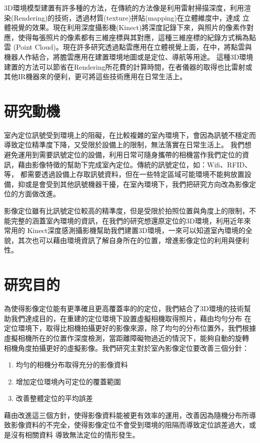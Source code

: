 	3D環境模型建置有許多種的方法，在傳統的方法像是利用雷射掃描深度，利用渲染(Rendering)的技術，透過材質(texture)拼貼(mapping)在立體維度中，達成
立體視覺的效果。現在利用深度攝影機(Kinect)將深度記錄下來，與照片的像素作對應，使得每張照片的像素都有三維座標與其對應，這種三維座標的紀錄方式稱為點雲
(Point Cloud)。現在許多研究透過點雲應用在立體視覺上面，在\cite{Rusu2011}中，將點雲與機器人作結合，將膽雲應用在建置環境地圖或是定位、導航等用途。
這種3D環境建置的方法可以節省在Rendering所花費的計算時間，在者儀器的取得也比雷射或其他IR機器來的便利，更可將這些技術應用在日常生活上。
	
\section{研究動機}

	室內定位訊號受到環境上的阻礙，在比較複雜的室內環境下，會因為訊號不穩定而導致定位精準度下降，又受限於設備上的限制，無法落實在日常生活上。
我們想避免運用到需要訊號定位的設備，利用日常可隨身攜帶的相機當作我們定位的資訊，藉由影像特徵的幫助下完成室內定位。傳統的訊號定位，如：Wifi、RFID、等，
都需要透過設備上存取訊號資料，但在一些特定區域可能環境不能夠放置設備，抑或是會受到其他訊號機器干擾，在室內環境下，我們把研究方向改為影像定位的方面做改進。

	影像定位雖有比訊號定位較高的精準度，但是受限於拍照位置與角度上的限制，不能完整的涵蓋室內環境的資訊，在我們的研究想還原定位的3D環境，利用近年來常用的
Kinect深度感測攝影機幫助我們建置3D環境，一來可以知道室內環境的全貌，其次也可以藉由環境資訊了解自身所在的位置，增進影像定位的利用與便利性。

\section{研究目的}
		
	為使得影像定位能有更準確且更高覆蓋率的的定位，我們結合了3D環境的技術幫助我們達成目的，在重建的定位環境下設置虛擬相機取得照片，藉由均勻分布
在定位環境下，取得比相機拍攝更好的影像來源，除了均勻的分布位置外，我們根據虛擬相機所在的位置作深度檢測，當距離障礙物過近的情況下，能夠自動的旋轉
相機角度拍攝更好的虛擬影像。我們研究主對於室內影像定位要改善三個分針：
\begin{enumerate}
	  \item 均勻的相機分布取得充分的影像資料
	  \item 增加定位環境內可定位的覆蓋範圍
	  \item 改善整體定位的平均誤差
\end{enumerate}
	藉由改進這三個方針，使得影像資料能被更有效率的運用，改善因為隨機分布所導致影像資料的不完全，使得影像定位不會受到環境的阻隔而導致定位誤差過大，或是沒有相關資料
導致無法定位的情形發生。

